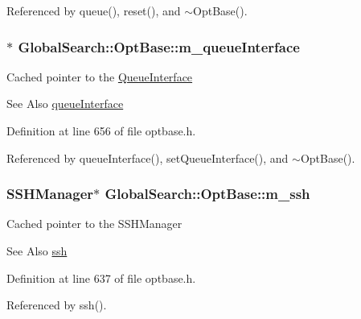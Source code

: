 Referenced by queue(), reset(), and $\sim$\-Opt\-Base().

\hypertarget{classGlobalSearch_1_1OptBase_a8f5f83dae1456bbff32ea9b3b6731ba0}{
\subsubsection[{m\-\_\-queue\-Interface}]{$\ast$ Global\-Search\-::\-Opt\-Base\-::m\-\_\-queue\-Interface\hspace{0.3cm}{\ttfamily [protected]}}}\label{classGlobalSearch_1_1OptBase_a8f5f83dae1456bbff32ea9b3b6731ba0}
Cached pointer to the \hyperlink{classGlobalSearch_1_1QueueInterface}{Queue\-Interface} \begin{DoxySeeAlso}{See Also}
\hyperlink{classGlobalSearch_1_1OptBase_a73faf60edcd3db57538349f5a636576e}{queue\-Interface} 
\end{DoxySeeAlso}


Definition at line 656 of file optbase.\-h.



Referenced by queue\-Interface(), set\-Queue\-Interface(), and $\sim$\-Opt\-Base().

\hypertarget{classGlobalSearch_1_1OptBase_a723a6dd0bb93aff451007ccb079e2f65}{
\subsubsection[{m\-\_\-ssh}]{\setlength{\rightskip}{0pt plus 5cm}S\-S\-H\-Manager$\ast$ Global\-Search\-::\-Opt\-Base\-::m\-\_\-ssh\hspace{0.3cm}{\ttfamily [protected]}}}\label{classGlobalSearch_1_1OptBase_a723a6dd0bb93aff451007ccb079e2f65}
Cached pointer to the S\-S\-H\-Manager \begin{DoxySeeAlso}{See Also}
\hyperlink{classGlobalSearch_1_1OptBase_a40064a3c1e6d0acae26b1908a8bdf5db}{ssh} 
\end{DoxySeeAlso}


Definition at line 637 of file optbase.\-h.



Referenced by ssh().

